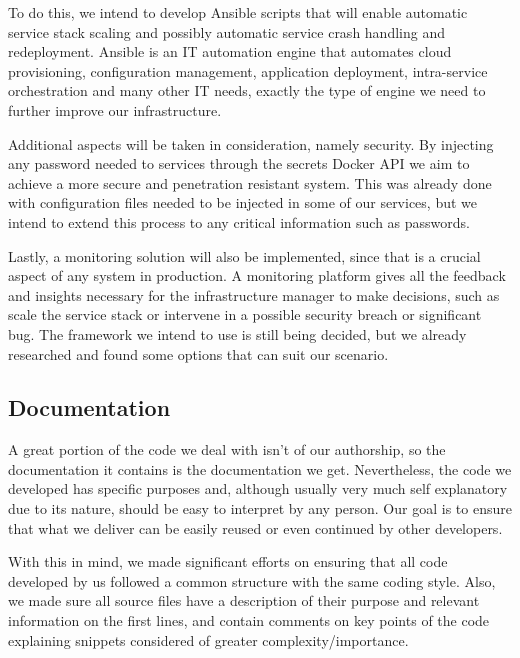 \documentclass[12pt]{article}
\begin{document}
To do this, we intend to develop Ansible scripts that will enable automatic service stack scaling and possibly automatic service crash handling and redeployment.
Ansible \cite{ansible} is an IT automation engine that automates cloud provisioning, configuration management, application deployment, intra-service orchestration 
and many other IT needs, exactly the type of engine we need to further improve our infrastructure.

Additional aspects will be taken in consideration, namely security. 
By injecting any password needed to services through the secrets Docker API we aim to achieve a more secure and penetration resistant system. 
This was already done with configuration files needed to be injected in some of our services, but we intend to extend this process to any critical information 
such as passwords.

Lastly, a monitoring solution will also be implemented, since that is a crucial aspect of any system in production. A monitoring platform gives all the feedback and insights necessary for the infrastructure manager to make decisions, such as scale the service stack or intervene in a possible security breach or significant bug. The framework we intend to use is still being decided, but we already researched and found some options that can suit our scenario.

\subsection{Documentation} \label{remarks.documentation} %


A great portion of the code we deal with isn't of our authorship, so the documentation it contains is the documentation we get.
Nevertheless, the code we developed has specific purposes and, although usually very much self explanatory due to its nature, should be easy to interpret by any person.
Our goal is to ensure that what we deliver can be easily reused or even continued by other developers.

With this in mind, we made significant efforts on ensuring that all code developed by us followed a common structure with the same coding style.
Also, we made sure all source files have a description of their purpose and relevant information on the first lines, and contain comments on key points of the 
code explaining snippets considered of greater complexity/importance.
\end{document}

